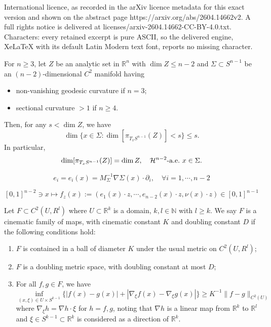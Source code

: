 \documentclass[10pt,a4paper]{amsart}
\newcommand{\R}{\mathbb{R}}
\newcommand{\calH}{\mathcal{H}}
\begin{document}
International licence, as recorded in the arXiv licence metadata for this exact version and shown on the abstract page https://arxiv.org/abs/2604.14662v2. A full rights notice is delivered at licenses/arxiv-2604.14662-CC-BY-4.0.txt. Characters: every retained excerpt is pure ASCII, so the delivered engine, XeLaTeX with its default Latin Modern text font, reports no missing character.
\begin{thm}\label{planemain}
For $n \ge 3$, let $Z$ be an analytic set in $\R^n$ with $\dim Z \le n-2$ and $\Sigma \subset S^{n-1}$ be an $(n-2)$-dimensional $C^2$ manifold having
\begin{itemize}
  \item non-vanishing geodesic curvature if $n=3$;
  \item sectional curvature $>1$ if $n \ge 4$.
\end{itemize}
Then, for any $s < \dim Z$, we have
  $$  \dim \{ x \in \Sigma : \dim [\pi_{T_{x}S^{n-1}}(Z)] < s  \} \le s.  $$
  In particular,
\begin{equation*}
   \dim [\pi_{T_{x}S^{n-1}}(Z)]  = \dim Z, \quad \calH^{n-2} \mbox{-\rm a.e.} \ x \in \Sigma.
\end{equation*}
\end{thm}

\begin{equation}\label{eix}
  e_i=e_i(x)=M_\Sigma^{-1}\nabla \Sigma(x)\cdot\partial_i, \quad \forall  i =1, \cdots, n-2
\end{equation}

\begin{equation}\label{fw}
  [0,1]^{n-2} \ni x \mapsto f_z(x):=(e_1(x)\cdot z, \cdots, e_{n-2}(x)\cdot z,  \nu(x)\cdot z) \in [0,1]^{n-1}
\end{equation}

\begin{definition}\label{cine}
  Let $F \subset C^2(U,R^l)$ where $U \subset \mathbb{R}^k$ is a domain, $k,l \in \mathbb{N}$ with $l \ge k$. We say $F$ is a cinematic family of
maps, with cinematic constant $K$ and doubling constant $D$ if the following conditions
hold:
\begin{enumerate}
  \item $F$ is contained in a ball of diameter $K$ under the usual metric on $C^2(U,R^l)$;
  \item $F$ is a doubling metric space, with doubling constant at most $D$;
  \item For all $f, g \in F$, we have
  $$  \inf_{(x,\xi) \in U \times S^{k-1}} \{ |f(x) - g(x)| + |\nabla_\xi f(x) -\nabla_\xi g(x)| \} \ge K^{-1} \|f-g\|_{C^2(U)}  $$
  where $\nabla_\xi h= \nabla h \cdot \xi$ for $h=f,g$, noting that $\nabla h$ is a linear map from $\R^{k}$ to $\R^l$ and $\xi \in S^{k-1} \subset \R^{k}$ is considered as a direction of $\R^{k}$.
\end{enumerate}
\end{definition}
\end{document}
